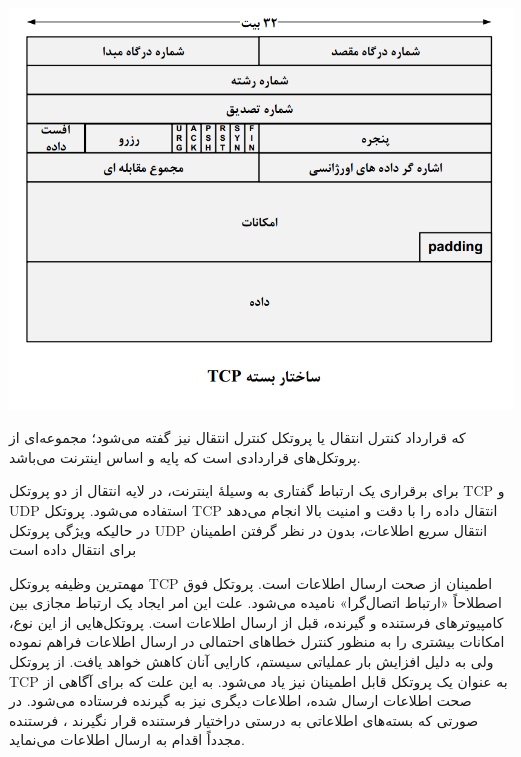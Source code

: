 \documentclass[12pt]{book}
\begin{document}
\subsection{}


\begin{center}
	\includegraphics[scale=0.6]{./tcp_1.png}
\end{center}


که قرارداد کنترل انتقال یا پروتکل کنترل انتقال نیز گفته می‌شود؛ مجموعه‌ای از پروتکل‌های قراردادی است که پایه و اساس اینترنت می‌باشد. 

برای برقراری یک ارتباط گفتاری به وسیلهٔ اینترنت، در لایه انتقال از دو پروتکل TCP و UDP استفاده می‌شود. پروتکل TCP انتقال داده را با دقت و امنیت بالا انجام می‌دهد در حالیکه ویژگی پروتکل UDP انتقال سریع اطلاعات، بدون در نظر گرفتن اطمینان برای انتقال داده است 


مهمترین وظیفه پروتکل TCP اطمینان از صحت ارسال اطلاعات است. پروتکل فوق اصطلاحاً «ارتباط اتصال‌گرا» نامیده می‌شود. علت این امر ایجاد یک ارتباط مجازی بین کامپیوترهای فرستنده و گیرنده، قبل از ارسال اطلاعات است. پروتکل‌هایی از این نوع، امکانات بیشتری را به منظور کنترل خطاهای احتمالی در ارسال اطلاعات فراهم نموده ولی به دلیل افزایش بار عملیاتی سیستم، کارایی آنان کاهش خواهد یافت. از پروتکل TCP به عنوان یک پروتکل قابل اطمینان نیز یاد می‌شود. به این علت که برای آگاهی از صحت اطلاعات ارسال شده، اطلاعات دیگری نیز به گیرنده فرستاده می‌شود. در صورتی که بسته‌های اطلاعاتی به درستی دراختیار فرستنده قرار نگیرند ، فرستنده مجدداً اقدام به ارسال اطلاعات می‌نماید. 
\end{document}
